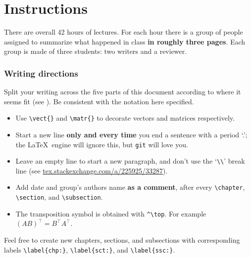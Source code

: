 \chapter*{Instructions}

There are overall 42 hours of lectures.
For each hour there is a group of people assigned to summarize what happened in class \textbf{in roughly three pages}.
Each group is made of three students: two writers and a reviewer.

\subsection*{Writing directions}

Split your writing across the five parts of this document according to where it seems fit (see ).
Be consistent with the notation here specified.
\begin{itemize}[noitemsep,nolistsep]
\item Use \verb|\vect{}| and \verb|\matr{}| to decorate vectors and matrices respectively.
\item Start a new line \textbf{only and every time} you end a sentence with a period `.'; the \LaTeX\ engine will ignore this, but \verb|git| will love you.
\item Leave an empty line to start a new paragraph, and don't use the `\verb|\\|' break line (see \url{tex.stackexchange.com/a/225925/33287}).
\item Add date and group's authors name \textbf{as a comment}, after every \verb|\chapter|, \verb|\section|, and \verb|\subsection|.
\item The transposition symbol is obtained with \verb|^\top|. For example $(AB)^\top = B^\top A^\top$.
\end{itemize}

Feel free to create new chapters, sections, and subsections with corresponding labels \verb|\label{chp:}|, \verb|\label{sct:}|, and \verb|\label{ssc:}|.


